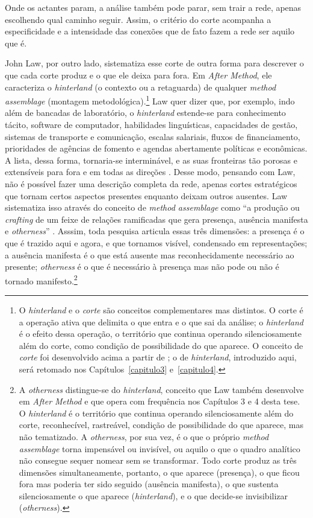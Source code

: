 \noindent Onde os actantes param, a análise também pode parar, sem trair a rede, apenas escolhendo qual caminho seguir. Assim, o critério do corte acompanha a especificidade e a intensidade das conexões que de fato fazem a rede ser aquilo que é.

John Law, por outro lado, sistematiza esse corte de outra forma para descrever o que cada corte produz e o que ele deixa para fora. Em \textit{After Method}, ele caracteriza o \textit{hinterland} (o contexto ou a retaguarda) de qualquer \textit{method assemblage} (montagem metodológica).\footnote{O \textit{hinterland} e o \textit{corte} são conceitos complementares mas distintos. O corte é a operação ativa que delimita o que entra e o que sai da análise; o \textit{hinterland} é o efeito dessa operação, o território que continua operando silenciosamente além do corte, como condição de possibilidade do que aparece. O conceito de \textit{corte} foi desenvolvido acima a partir de \textcite{strathern2011cortando}; o de \textit{hinterland}, introduzido aqui, será retomado nos Capítulos~\ref{capitulo3} e~\ref{capitulo4}.} Law quer dizer que, por exemplo, indo além de bancadas de laboratório, o \textit{hinterland} estende-se para conhecimento tácito, software de computador, habilidades linguísticas, capacidades de gestão, sistemas de transporte e comunicação, escalas salariais, fluxos de financiamento, prioridades de agências de fomento e agendas abertamente políticas e econômicas. A lista, dessa forma, tornaria-se interminável, e as suas fronteiras tão porosas e extensíveis para fora e em todas as direções \parencite[pp.~40--41]{Law2004After}. Desse modo, pensando com Law, não é possível fazer uma descrição completa da rede, apenas cortes estratégicos que tornam certos aspectos presentes enquanto deixam outros ausentes. Law sistematiza isso através do conceito de \textit{method assemblage} como ``a produção ou \textit{crafting} de um feixe de relações ramificadas que gera presença, ausência manifesta e \textit{otherness}'' \parencite[p.~84]{Law2004After}. Asssim, toda pesquisa articula essas três dimensões: a presença é o que é trazido aqui e agora, e que tornamos visível, condensado em representações; a ausência manifesta é o que está ausente mas reconhecidamente necessário ao presente; \textit{otherness} é o que é necessário à presença mas não pode ou não é tornado manifesto.\footnote{A \textit{otherness} distingue-se do \textit{hinterland}, conceito que Law também desenvolve em \textit{After Method} \parencite[pp.~34--42]{Law2004After} e que opera com frequência nos Capítulos 3 e 4 desta tese. O \textit{hinterland} é o território que continua operando silenciosamente além do corte, reconhecível, rastreável, condição de possibilidade do que aparece, mas não tematizado. A \textit{otherness}, por sua vez, é o que o próprio \textit{method assemblage} torna impensável ou invisível, ou aquilo o que o quadro analítico não consegue sequer nomear sem se transformar. Todo corte produz as três dimensões simultaneamente, portanto, o que aparece (presença), o que ficou fora mas poderia ter sido seguido (ausência manifesta), o que sustenta silenciosamente o que aparece (\textit{hinterland}), e o que decide-se invisibilizar (\textit{otherness}).}

